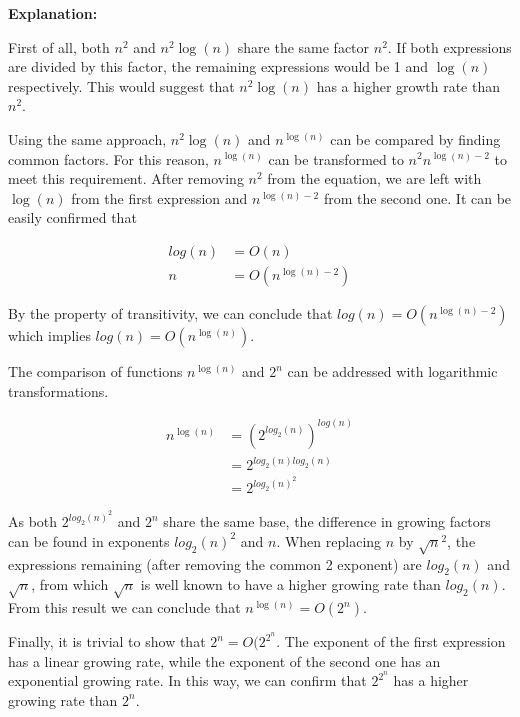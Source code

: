 \documentclass[12pt]{article}
\begin{document}
\textbf{Explanation:}

First of all, both $n^2$ and $n^2 \log(n)$ share the same factor $n^2$. If both expressions are divided by this factor, the remaining expressions would be 1 and $\log(n)$ respectively. This would suggest that $n^2 \log(n)$ has a higher growth rate than $n^2$.

Using the same approach,  $n^2 \log(n)$ and $n^{\log (n)}$ can be compared by finding common factors. For this reason, $n^{\log (n)}$ can be transformed to $n^2 n^{\log (n) - 2}$ to meet this requirement. After removing $n^2$ from the equation, we are left with $\log(n)$ from the first expression and $n^{\log (n) - 2}$ from the second one. It can be easily confirmed that

\begin{align*}
log (n) &= O(n) \\
n &= O(n^{\log (n) - 2})
\end{align*}

By the property of transitivity, we can conclude that $log (n) = O(n^{\log (n) - 2})$ which implies $log (n) = O(n^{\log (n)})$.

The comparison of functions $n^{\log (n)}$ and $2^{n}$ can be addressed with logarithmic transformations.

\begin{align*}
n^{\log (n)} &= (2 ^ {log_2(n)})^{log (n)} \\
&= 2 ^ {{log_2(n)} {log_2(n)}}\\
&= 2 ^ {log_2(n) ^ 2}
\end{align*}

As both $2 ^ {log_2(n) ^ 2}$ and $2^{n}$ share the same base, the difference in growing factors can be found in exponents $log_2(n) ^ 2$ and $n$. When replacing $n$ by $\sqrt{n}^2$, the expressions remaining (after removing the common 2 exponent) are $log_2(n)$ and $\sqrt{n}$, from which $\sqrt{n}$ is well known to have a higher growing rate than $log_2(n)$. From this result we can conclude that $n^{\log (n)} = O(2^{n})$.

Finally, it is trivial to show that $2^n = O(2^{2^n}$. The exponent of the first expression has a linear growing rate, while the exponent of the second one has an exponential growing rate. In this way, we can confirm that $2^{2^n}$ has a higher growing rate than $2^n$.
\end{document}
